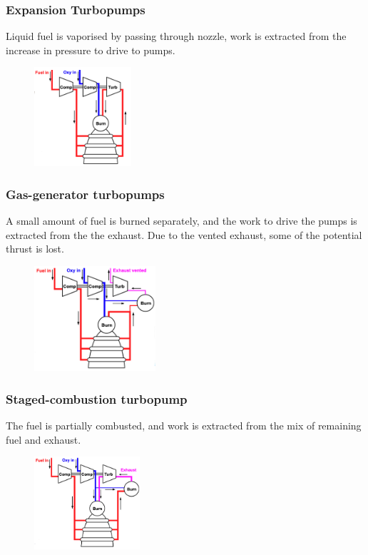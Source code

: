 \documentclass[a4paper,10pt]{article}
\begin{document}
\begin{multicols}{2}
\subsubsection{Expansion Turbopumps}
Liquid fuel is vaporised by passing through nozzle, work is extracted from the increase in pressure to drive to pumps. 
\begin{figure}[H]
    \centering
    \includegraphics[width=0.32\textwidth]{Figure/turbopump1.png}
\end{figure}

\vspace*{-0.5cm}
\subsubsection{Gas-generator turbopumps}
A small amount of fuel is burned separately, and the work to drive the pumps is extracted from the the exhaust. Due to the vented exhaust, some of the potential thrust is lost. 
\begin{figure}[H]
    \centering
    \includegraphics[width=0.4\textwidth]{Figure/turbopump.png}
\end{figure}

\subsubsection{Staged-combustion turbopump}
The fuel is partially combusted, and work is extracted from the mix of remaining fuel and exhaust.
\begin{figure}[H]
    \centering
    \includegraphics[width=0.35\textwidth]{Figure/staged1.png}
\end{figure}


\end{multicols}
\end{document}
